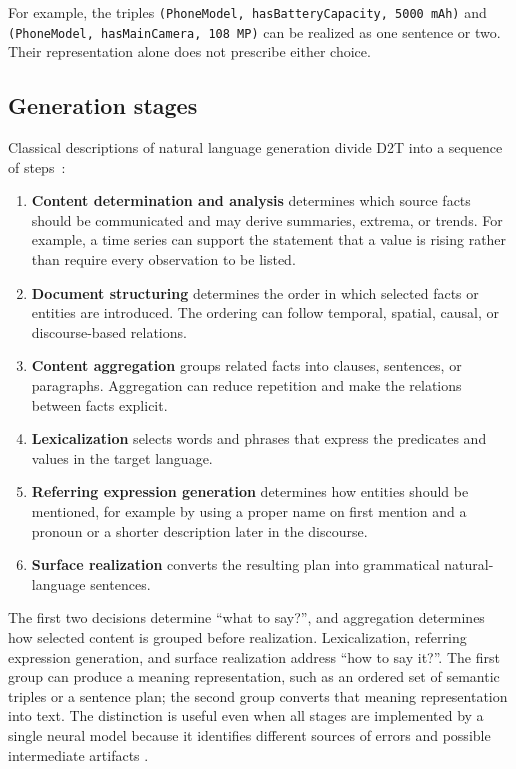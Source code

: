 For example, the triples \texttt{(PhoneModel, hasBatteryCapacity, 5000 mAh)}
and \texttt{(PhoneModel, hasMainCamera, 108 MP)} can be realized as one sentence
or two. Their representation alone does not prescribe either choice.

\subsection{Generation stages}

Classical descriptions of natural language generation divide D2T into a
sequence of steps~\cite{reiter1997building,gatt2018survey}:

\begin{enumerate}
    \item \textbf{Content determination and analysis} determines which source
    facts should be communicated and may derive summaries, extrema, or trends.
    For example, a time series can support the statement that a value is rising
    rather than require every observation to be listed.
    \item \textbf{Document structuring} determines the order in which selected
    facts or entities are introduced. The ordering can follow temporal,
    spatial, causal, or discourse-based relations.
    \item \textbf{Content aggregation} groups related facts into clauses,
    sentences, or paragraphs. Aggregation can reduce repetition and make the
    relations between facts explicit.
    \item \textbf{Lexicalization} selects words and phrases that express the
    predicates and values in the target language.
    \item \textbf{Referring expression generation} determines how entities
    should be mentioned, for example by using a proper name on first mention and
    a pronoun or a shorter description later in the discourse.
    \item \textbf{Surface realization} converts the resulting plan into
    grammatical natural-language sentences.
\end{enumerate}

The first two decisions determine ``what to say?'', and aggregation determines
how selected content is grouped before realization. Lexicalization, referring
expression generation, and surface realization address ``how to say it?''. The
first group can produce a meaning representation, such as an ordered set of semantic triples or a
sentence plan; the second group converts that meaning representation into text. The distinction is
useful even when all stages are implemented by a single neural model because it
identifies different sources of errors and possible intermediate artifacts
\cite{moryossef-etal-2019-step}.

